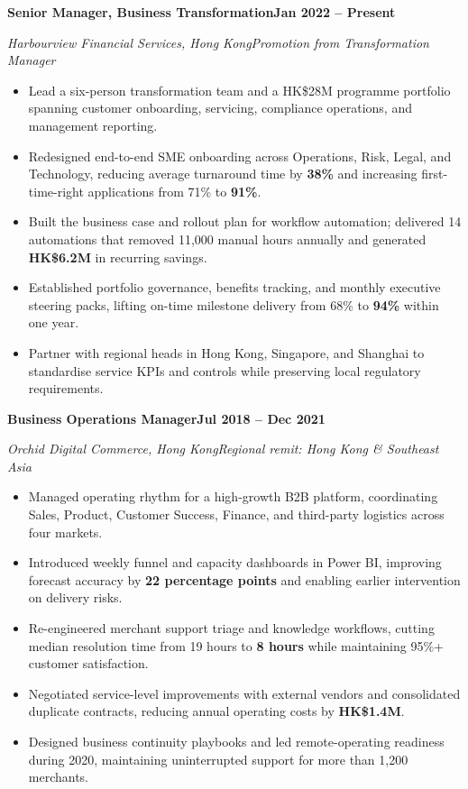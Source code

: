 \documentclass[10pt,a4paper]{article}
\newcommand{\role}[4]{%
  \textbf{\color{ink}#1}\hfill\textbf{\color{navy}#2}\par
  \textit{\color{muted}#3}\hfill\textit{\color{muted}#4}\par\vspace{-0.15em}
}
\begin{document}
\role{Senior Manager, Business Transformation}{Jan 2022 -- Present}
     {Harbourview Financial Services, Hong Kong}{Promotion from Transformation Manager}
\begin{itemize}
  \item Lead a six-person transformation team and a HK\$28M programme portfolio spanning customer onboarding, servicing, compliance operations, and management reporting.
  \item Redesigned end-to-end SME onboarding across Operations, Risk, Legal, and Technology, reducing average turnaround time by \textbf{38\%} and increasing first-time-right applications from 71\% to \textbf{91\%}.
  \item Built the business case and rollout plan for workflow automation; delivered 14 automations that removed 11,000 manual hours annually and generated \textbf{HK\$6.2M} in recurring savings.
  \item Established portfolio governance, benefits tracking, and monthly executive steering packs, lifting on-time milestone delivery from 68\% to \textbf{94\%} within one year.
  \item Partner with regional heads in Hong Kong, Singapore, and Shanghai to standardise service KPIs and controls while preserving local regulatory requirements.
\end{itemize}

\vspace{0.28em}
\role{Business Operations Manager}{Jul 2018 -- Dec 2021}
     {Orchid Digital Commerce, Hong Kong}{Regional remit: Hong Kong \& Southeast Asia}
\begin{itemize}
  \item Managed operating rhythm for a high-growth B2B platform, coordinating Sales, Product, Customer Success, Finance, and third-party logistics across four markets.
  \item Introduced weekly funnel and capacity dashboards in Power BI, improving forecast accuracy by \textbf{22 percentage points} and enabling earlier intervention on delivery risks.
  \item Re-engineered merchant support triage and knowledge workflows, cutting median resolution time from 19 hours to \textbf{8 hours} while maintaining 95\%+ customer satisfaction.
  \item Negotiated service-level improvements with external vendors and consolidated duplicate contracts, reducing annual operating costs by \textbf{HK\$1.4M}.
  \item Designed business continuity playbooks and led remote-operating readiness during 2020, maintaining uninterrupted support for more than 1,200 merchants.
\end{itemize}
\end{document}
